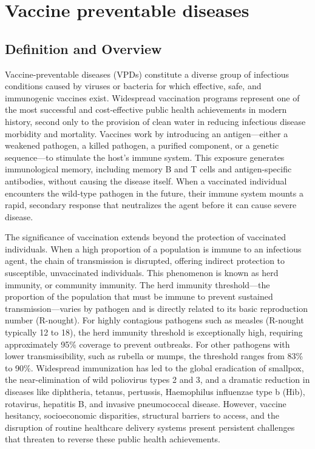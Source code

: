 \chapter{Vaccine preventable diseases}

\section*{Definition and Overview}
Vaccine-preventable diseases (VPDs) constitute a diverse group of infectious conditions caused by viruses or bacteria for which effective, safe, and immunogenic vaccines exist. Widespread vaccination programs represent one of the most successful and cost-effective public health achievements in modern history, second only to the provision of clean water in reducing infectious disease morbidity and mortality. Vaccines work by introducing an antigen—either a weakened pathogen, a killed pathogen, a purified component, or a genetic sequence—to stimulate the host's immune system. This exposure generates immunological memory, including memory B and T cells and antigen-specific antibodies, without causing the disease itself. When a vaccinated individual encounters the wild-type pathogen in the future, their immune system mounts a rapid, secondary response that neutralizes the agent before it can cause severe disease.

The significance of vaccination extends beyond the protection of vaccinated individuals. When a high proportion of a population is immune to an infectious agent, the chain of transmission is disrupted, offering indirect protection to susceptible, unvaccinated individuals. This phenomenon is known as herd immunity, or community immunity. The herd immunity threshold—the proportion of the population that must be immune to prevent sustained transmission—varies by pathogen and is directly related to its basic reproduction number (R-nought). For highly contagious pathogens such as measles (R-nought typically 12 to 18), the herd immunity threshold is exceptionally high, requiring approximately 95\% coverage to prevent outbreaks. For other pathogens with lower transmissibility, such as rubella or mumps, the threshold ranges from 83\% to 90\%. Widespread immunization has led to the global eradication of smallpox, the near-elimination of wild poliovirus types 2 and 3, and a dramatic reduction in diseases like diphtheria, tetanus, pertussis, Haemophilus influenzae type b (Hib), rotavirus, hepatitis B, and invasive pneumococcal disease. However, vaccine hesitancy, socioeconomic disparities, structural barriers to access, and the disruption of routine healthcare delivery systems present persistent challenges that threaten to reverse these public health achievements.


